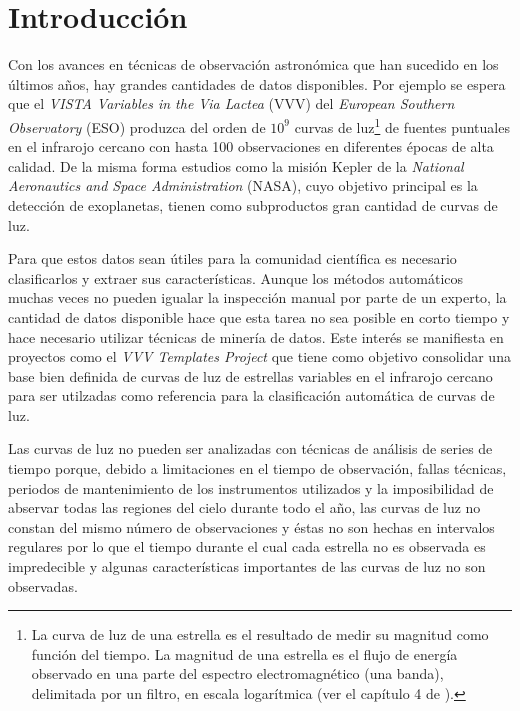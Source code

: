 \documentclass[letterpaper,12pt]{book}
\begin{document}
\tableofcontents

 
\chapter{Introducción}

Con los avances en técnicas de observación astronómica que han sucedido en los últimos años, hay grandes cantidades de datos disponibles. Por ejemplo se espera que el \textit{VISTA Variables in the Via Lactea} (VVV) del \textit{European Southern Observatory} (ESO) produzca del orden de $10^{9}$ curvas de luz\footnote{\label{nota:curvasDeLuz} La curva de luz de una estrella es el resultado de medir su magnitud como función del tiempo. La magnitud de una estrella es el flujo de energía observado en una parte del espectro electromagnético (una banda), delimitada por un filtro, en escala logarítmica (ver el capítulo 4 de \cite{karttunen_fundamental_2007}).} de fuentes puntuales en el infrarojo cercano con hasta 100 observaciones en diferentes épocas de alta calidad. De la misma forma estudios como la misión Kepler de la \textit{National Aeronautics and Space Administration} (NASA), cuyo objetivo principal es la detección de exoplanetas,  tienen como subproductos gran cantidad de curvas  de luz. 

Para que estos datos sean útiles para la comunidad científica es necesario clasificarlos y extraer sus características. Aunque los métodos automáticos muchas veces no pueden igualar la inspección manual por parte de un experto, la cantidad de datos disponible hace que esta tarea no sea posible en corto tiempo y hace necesario utilizar técnicas de minería de datos. Este interés se manifiesta en proyectos como el \textit{VVV Templates Project} que tiene como objetivo consolidar una base bien definida de curvas de luz de estrellas variables en el infrarojo cercano para ser utilzadas como referencia para la clasificación automática de curvas de luz.

Las curvas de luz no pueden ser analizadas con técnicas de análisis de series de tiempo porque, debido a limitaciones en el tiempo de observación, fallas técnicas, periodos de mantenimiento de los instrumentos utilizados y la imposibilidad de abservar todas las regiones del cielo durante todo el año, las curvas de luz no constan del mismo número de observaciones y éstas no son hechas en intervalos regulares por lo que el tiempo durante el cual cada estrella no es observada es impredecible y algunas características importantes de las curvas de luz no son observadas. 
\end{document}
